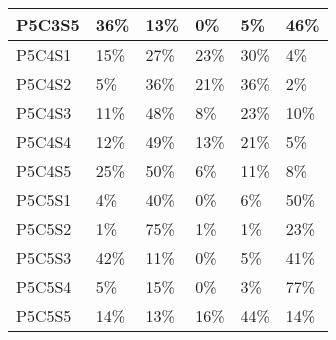 \begin{longtable}{|l|l|l|l|l|l|}
P5C3S5 & 36\% & 13\% & 0\% & 5\% & 46\% \\ \hline
P5C4S1 & 15\% & 27\% & 23\% & 30\% & 4\% \\ \hline
P5C4S2 & 5\% & 36\% & 21\% & 36\% & 2\% \\ \hline
P5C4S3 & 11\% & 48\% & 8\% & 23\% & 10\% \\ \hline
P5C4S4 & 12\% & 49\% & 13\% & 21\% & 5\% \\ \hline
P5C4S5 & 25\% & 50\% & 6\% & 11\% & 8\% \\ \hline
P5C5S1 & 4\% & 40\% & 0\% & 6\% & 50\% \\ \hline
P5C5S2 & 1\% & 75\% & 1\% & 1\% & 23\% \\ \hline
P5C5S3 & 42\% & 11\% & 0\% & 5\% & 41\% \\ \hline
P5C5S4 & 5\% & 15\% & 0\% & 3\% & 77\% \\ \hline
P5C5S5 & 14\% & 13\% & 16\% & 44\% & 14\% \\ \hline
\end{longtable}

